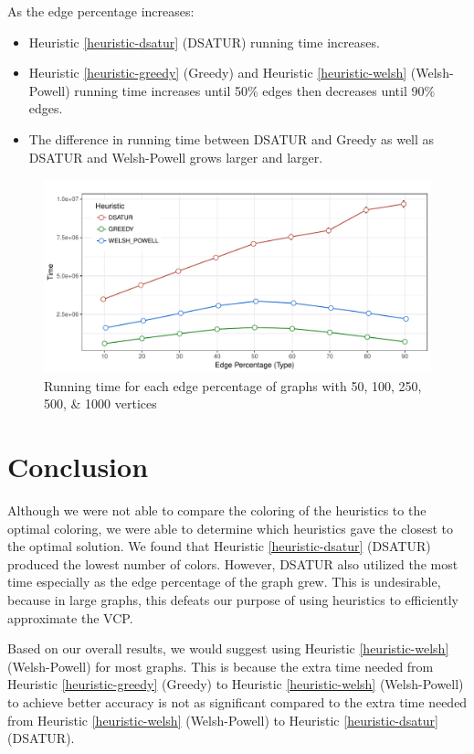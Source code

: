 \documentclass{article}
\newcounter{heuristic} \setcounter{heuristic}{0}
\theoremstyle{definition}
\begin{document}
\newpage

As the edge percentage increases:
\begin{itemize}
  \item Heuristic \ref{heuristic-dsatur} (DSATUR) running time increases.
  \item Heuristic \ref{heuristic-greedy} (Greedy) and Heuristic \ref{heuristic-welsh} (Welsh-Powell) running time increases until 50\% edges then decreases until 90\% edges.
  \item The difference in running time between DSATUR and Greedy as well as DSATUR and Welsh-Powell grows larger and larger.
\end{itemize}

\begin{figure}[H]
  \includegraphics[width=\linewidth]{../poster/figures/plot-time.pdf}
  \caption{Running time for each edge percentage of graphs with 50, 100, 250, 500, \& 1000 vertices}\label{fig:compare-time}
\end{figure}

\section{Conclusion}
Although we were not able to compare the coloring of the heuristics to the optimal coloring, we were able to determine which heuristics gave the closest to the optimal solution. We found that Heuristic \ref{heuristic-dsatur} (DSATUR) produced the lowest number of colors. However, DSATUR also utilized the most time especially as the edge percentage of the graph grew. This is undesirable, because in large graphs, this defeats our purpose of using heuristics to efficiently approximate the VCP.

Based on our overall results, we would suggest using Heuristic \ref{heuristic-welsh} (Welsh-Powell) for most graphs. This is because the extra time needed from Heuristic \ref{heuristic-greedy} (Greedy) to Heuristic \ref{heuristic-welsh} (Welsh-Powell) to achieve better accuracy is not as significant compared to the extra time needed from Heuristic \ref{heuristic-welsh} (Welsh-Powell) to  Heuristic \ref{heuristic-dsatur} (DSATUR).



\newpage


\end{document}
